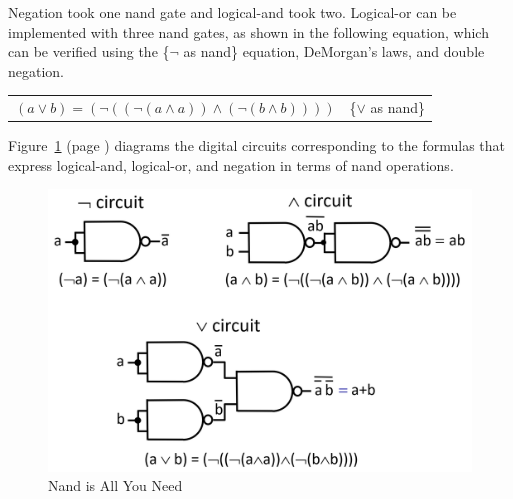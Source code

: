 Negation took one nand gate and
logical-and took two.
Logical-or can be implemented with three nand gates,
as shown in the following equation,
which can be verified using
the \{$\neg$ as nand\} equation, DeMorgan's laws,
and double negation.

\begin{center}
\begin{tabular}{ll}
$(a \vee b) = (\neg ((\neg(a \wedge a)) \wedge (\neg(b \wedge b))))$ & \{$\vee$ as nand\}\label{or-as-nand}
\end{tabular}
\end{center}

Figure~\ref{fig-02-nand-is-all-you-need} (page \pageref{fig-02-nand-is-all-you-need})
diagrams the digital circuits
corresponding to the formulas that express logical-and, logical-or, and negation
in terms of nand operations.

\begin{figure}
\begin{center}
\includegraphics[scale=0.27]{images/NandIsAllYouNeed.png}
\end{center}
\caption{Nand is All You Need}
\label{fig-02-nand-is-all-you-need}
\end{figure}

